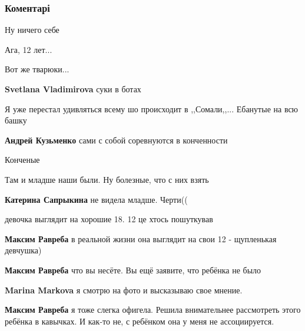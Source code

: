  
 
 
 
 
\subsubsection{Коментарі}
\label{sec:12_10_2021.fb.markova_marina.lugansk.lnr.1.savenkova_mirotvorec.cmt}

\begin{itemize} %
Ну ничего себе

Ага, 12 лет...

Вот же тварюки...

\textbf{Svetlana Vladimirova} суки в ботах

Я уже перестал удивляться всему шо происходит в ,,Сомали,,... Ебанутые на всю башку

\textbf{Андрей Кузьменко} сами с собой соревнуются в конченности

Конченые

Там и младше наши были. Ну болезные, что с них взять

\textbf{Катерина Сапрыкина} не видела младше. Черти((

девочка выглядит на хорошие 18. 12 це хтось пошуткував

\begin{itemize} %
\textbf{Максим Равреба} в реальной жизни она выглядит на свои 12 - щупленькая девчушка)

\textbf{Максим Равреба} что вы несёте. Вы ещё заявите, что ребёнка не было

\textbf{Marina Markova} я смотрю на фото и высказываю свое мнение.

\textbf{Максим Равреба} я тоже слегка офигела. Решила внимательнее рассмотреть этого ребёнка в кавычках. И как-то не, с ребёнком она у меня не ассоциируется.



\end{itemize}
\end{itemize}
